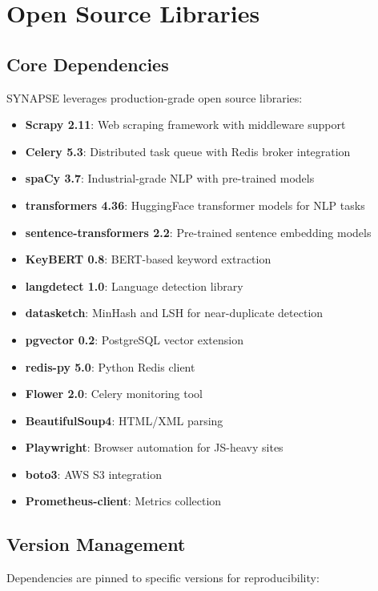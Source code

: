 \documentclass[12pt,a4paper]{report}
\begin{document}
\chapter{Open Source Libraries}

\section{Core Dependencies}

SYNAPSE leverages production-grade open source libraries:

\begin{itemize}
    \item \textbf{Scrapy 2.11}: Web scraping framework with middleware support
    \item \textbf{Celery 5.3}: Distributed task queue with Redis broker integration
    \item \textbf{spaCy 3.7}: Industrial-grade NLP with pre-trained models
    \item \textbf{transformers 4.36}: HuggingFace transformer models for NLP tasks
    \item \textbf{sentence-transformers 2.2}: Pre-trained sentence embedding models
    \item \textbf{KeyBERT 0.8}: BERT-based keyword extraction
    \item \textbf{langdetect 1.0}: Language detection library
    \item \textbf{datasketch}: MinHash and LSH for near-duplicate detection
    \item \textbf{pgvector 0.2}: PostgreSQL vector extension
    \item \textbf{redis-py 5.0}: Python Redis client
    \item \textbf{Flower 2.0}: Celery monitoring tool
    \item \textbf{BeautifulSoup4}: HTML/XML parsing
    \item \textbf{Playwright}: Browser automation for JS-heavy sites
    \item \textbf{boto3}: AWS S3 integration
    \item \textbf{Prometheus-client}: Metrics collection
\end{itemize}

\section{Version Management}

Dependencies are pinned to specific versions for reproducibility:
\end{document}
